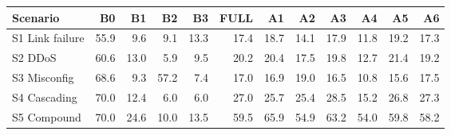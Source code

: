 \begin{tabular}{lrrrrrrrrrrr}
\toprule
Scenario & B0 & B1 & B2 & B3 & FULL & A1 & A2 & A3 & A4 & A5 & A6 \\
\midrule
S1 Link failure & 55.9 & 9.6 & 9.1 & 13.3 & 17.4 & 18.7 & 14.1 & 17.9 & 11.8 & 19.2 & 17.3 \\
S2 DDoS & 60.6 & 13.0 & 5.9 & 9.5 & 20.2 & 20.4 & 17.5 & 19.8 & 12.7 & 21.4 & 19.2 \\
S3 Misconfig & 68.6 & 9.3 & 57.2 & 7.4 & 17.0 & 16.9 & 19.0 & 16.5 & 10.8 & 15.6 & 17.5 \\
S4 Cascading & 70.0 & 12.4 & 6.0 & 6.0 & 27.0 & 25.7 & 25.4 & 28.5 & 15.2 & 26.8 & 27.3 \\
S5 Compound & 70.0 & 24.6 & 10.0 & 13.5 & 59.5 & 65.9 & 54.9 & 63.2 & 54.0 & 59.8 & 58.2 \\
\bottomrule
\end{tabular}
